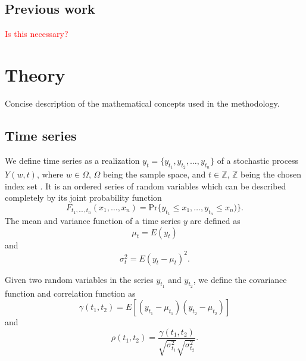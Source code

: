 \documentclass{article}
\theoremstyle{plain}
\theoremstyle{definition}
\theoremstyle{remark}
\begin{document}
\subsection{Previous work}
\textcolor{red}{Is this necessary?}


\section{Theory}
Concise description of the mathematical concepts used in the methodology.
\subsection{Time series}
We define time series as a realization $y_t = \{ y_{t_1}, y_{t_2}, \hdots, y_{t_n} \}$ of a stochastic process $Y(w, t)$, where $w \in \Omega$, $\Omega$ being the sample space,  and $t \in \mathbb{Z}$, $\mathbb{Z}$ being the chosen index set  \cite{wei}.
It is an ordered series of random variables which can be described completely by its joint probability function
\begin{equation*}
        F_{t_1,\hdots, t_n}(x_1, \hdots, x_n) = \text{Pr}\{ y_{t_1} \leq x_{1}, \hdots, y_{t_n} \leq x_n) \}.
\end{equation*}
The mean and variance function of a time series $y$ are defined as
\begin{equation}\label{eq:mean_func}
        \mu_t = E(y_t)  
\end{equation}
and
\begin{equation*}
        \sigma_t^2 = E(y_t - \mu_t)^2.
\end{equation*}

Given two random variables in the series $y_{t_1}$ and $y_{t_2}$, we define the covariance function and correlation function as
\begin{equation}\label{eq:acv}
        \gamma (t_{1}, t_2) = E[(y_{t_1} - \mu_{t_1})(y_{t_2} - \mu_{t_2})]
\end{equation}
and 
\begin{equation}\label{eq:acf}
        \rho(t_1, t_2) = \frac{\gamma ( t_1, t_2)}{\sqrt{\sigma_{t_1}^2}\sqrt{\sigma_{t_2}^{2}}}.
\end{equation}
\end{document}
